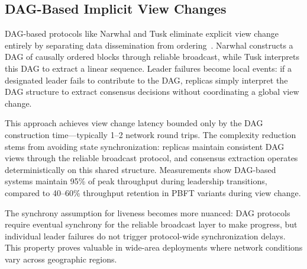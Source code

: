 \subsection{DAG-Based Implicit View Changes}

DAG-based protocols like Narwhal and Tusk eliminate explicit view change entirely by separating data dissemination from ordering~\cite{danezis2022narwhal}. Narwhal constructs a DAG of causally ordered blocks through reliable broadcast, while Tusk interprets this DAG to extract a linear sequence. Leader failures become local events: if a designated leader fails to contribute to the DAG, replicas simply interpret the DAG structure to extract consensus decisions without coordinating a global view change.

This approach achieves view change latency bounded only by the DAG construction time—typically 1--2 network round trips. The complexity reduction stems from avoiding state synchronization: replicas maintain consistent DAG views through the reliable broadcast protocol, and consensus extraction operates deterministically on this shared structure. Measurements show DAG-based systems maintain 95\% of peak throughput during leadership transitions, compared to 40--60\% throughput retention in PBFT variants during view change.

The synchrony assumption for liveness becomes more nuanced: DAG protocols require eventual synchrony for the reliable broadcast layer to make progress, but individual leader failures do not trigger protocol-wide synchronization delays. This property proves valuable in wide-area deployments where network conditions vary across geographic regions.